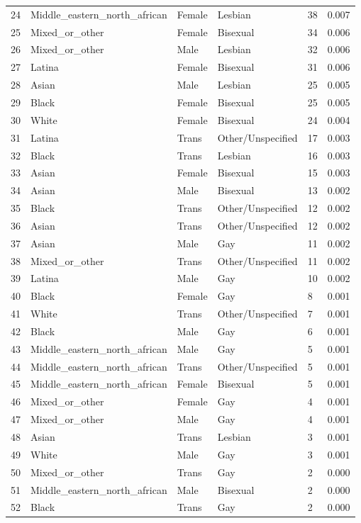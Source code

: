 \begin{table}[htbp]
\begin{tabular}{llllll}
24 & Middle\_eastern\_north\_african & Female & Lesbian & 38 & 0.007 \\
25 & Mixed\_or\_other & Female & Bisexual & 34 & 0.006 \\
26 & Mixed\_or\_other & Male & Lesbian & 32 & 0.006 \\
27 & Latina & Female & Bisexual & 31 & 0.006 \\
28 & Asian & Male & Lesbian & 25 & 0.005 \\
29 & Black & Female & Bisexual & 25 & 0.005 \\
30 & White & Female & Bisexual & 24 & 0.004 \\
31 & Latina & Trans & Other/Unspecified & 17 & 0.003 \\
32 & Black & Trans & Lesbian & 16 & 0.003 \\
33 & Asian & Female & Bisexual & 15 & 0.003 \\
34 & Asian & Male & Bisexual & 13 & 0.002 \\
35 & Black & Trans & Other/Unspecified & 12 & 0.002 \\
36 & Asian & Trans & Other/Unspecified & 12 & 0.002 \\
37 & Asian & Male & Gay & 11 & 0.002 \\
38 & Mixed\_or\_other & Trans & Other/Unspecified & 11 & 0.002 \\
39 & Latina & Male & Gay & 10 & 0.002 \\
40 & Black & Female & Gay & 8 & 0.001 \\
41 & White & Trans & Other/Unspecified & 7 & 0.001 \\
42 & Black & Male & Gay & 6 & 0.001 \\
43 & Middle\_eastern\_north\_african & Male & Gay & 5 & 0.001 \\
44 & Middle\_eastern\_north\_african & Trans & Other/Unspecified & 5 & 0.001 \\
45 & Middle\_eastern\_north\_african & Female & Bisexual & 5 & 0.001 \\
46 & Mixed\_or\_other & Female & Gay & 4 & 0.001 \\
47 & Mixed\_or\_other & Male & Gay & 4 & 0.001 \\
48 & Asian & Trans & Lesbian & 3 & 0.001 \\
49 & White & Male & Gay & 3 & 0.001 \\
50 & Mixed\_or\_other & Trans & Gay & 2 & 0.000 \\
51 & Middle\_eastern\_north\_african & Male & Bisexual & 2 & 0.000 \\
52 & Black & Trans & Gay & 2 & 0.000 \\

\end{tabular}
\end{table}
